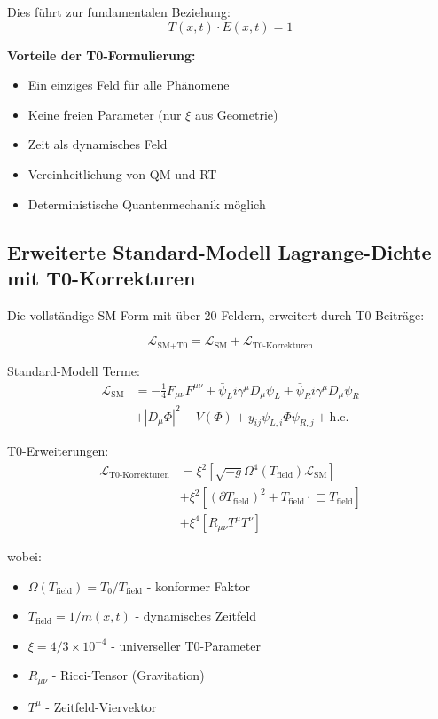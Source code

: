 	Dies führt zur fundamentalen Beziehung:
	\begin{equation}
		\boxed{T(x,t) \cdot E(x,t) = 1}
	\end{equation}
	
	\textbf{Vorteile der T0-Formulierung:}
	\begin{itemize}
		\item Ein einziges Feld für alle Phänomene
		\item Keine freien Parameter (nur $\xi$ aus Geometrie)
		\item Zeit als dynamisches Feld
		\item Vereinheitlichung von QM und RT
		\item Deterministische Quantenmechanik möglich
	\end{itemize}
	
	\subsection{Erweiterte Standard-Modell Lagrange-Dichte mit T0-Korrekturen}
	
	Die vollständige SM-Form mit über 20 Feldern, erweitert durch T0-Beiträge:
	
	\begin{smbox}
		\begin{equation}
			\mathcal{L}_{\text{SM+T0}} = \mathcal{L}_{\text{SM}} + \mathcal{L}_{\text{T0-Korrekturen}}
		\end{equation}
		
		Standard-Modell Terme:
		\begin{align}
			\mathcal{L}_{\text{SM}} &= -\frac{1}{4}F_{\mu\nu}F^{\mu\nu} + \bar{\psi}_L i\gamma^\mu D_\mu \psi_L + \bar{\psi}_R i\gamma^\mu D_\mu \psi_R \\
			&+ |D_\mu \Phi|^2 - V(\Phi) + y_{ij}\bar{\psi}_{L,i}\Phi\psi_{R,j} + \text{h.c.}
		\end{align}
		
		T0-Erweiterungen:
		\begin{align}
			\mathcal{L}_{\text{T0-Korrekturen}} &= \xi^2 \left[ \sqrt{-g} \Omega^4(T_{\text{field}}) \mathcal{L}_{\text{SM}} \right] \\
			&+ \xi^2 \left[ (\partial T_{\text{field}})^2 + T_{\text{field}} \cdot \Box T_{\text{field}} \right] \\
			&+ \xi^4 \left[ R_{\mu\nu} T^{\mu} T^{\nu} \right]
		\end{align}
		
		wobei:
		\begin{itemize}
			\item $\Omega(T_{\text{field}}) = T_0/T_{\text{field}}$ - konformer Faktor
			\item $T_{\text{field}} = 1/m(x,t)$ - dynamisches Zeitfeld
			\item $\xi = 4/3 \times 10^{-4}$ - universeller T0-Parameter
			\item $R_{\mu\nu}$ - Ricci-Tensor (Gravitation)
			\item $T^{\mu}$ - Zeitfeld-Viervektor
		\end{itemize}
	\end{smbox}
	
